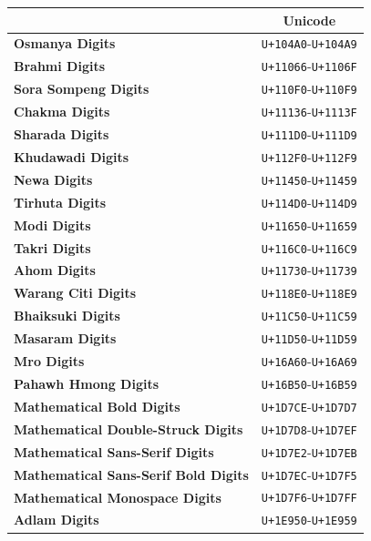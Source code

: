 \documentclass [10pt]{article}
\begin{document}
\begin{center}
  \begin{tabular}{|l|c|}
    \hline
    & \textbf{Unicode} \\ \hline
    \textbf{Osmanya Digits} & \texttt{U+104A0}-\texttt{U+104A9} \\ \hline
    \textbf{Brahmi Digits} & \texttt{U+11066}-\texttt{U+1106F} \\ \hline
    \textbf{Sora Sompeng Digits} & \texttt{U+110F0}-\texttt{U+110F9} \\ \hline
    \textbf{Chakma Digits} & \texttt{U+11136}-\texttt{U+1113F} \\ \hline
    \textbf{Sharada Digits} & \texttt{U+111D0}-\texttt{U+111D9} \\ \hline
    \textbf{Khudawadi Digits} & \texttt{U+112F0}-\texttt{U+112F9} \\ \hline
    \textbf{Newa Digits} & \texttt{U+11450}-\texttt{U+11459} \\ \hline
    \textbf{Tirhuta Digits} & \texttt{U+114D0}-\texttt{U+114D9} \\ \hline
    \textbf{Modi Digits} & \texttt{U+11650}-\texttt{U+11659} \\ \hline
    \textbf{Takri Digits} & \texttt{U+116C0}-\texttt{U+116C9} \\ \hline
    \textbf{Ahom Digits} & \texttt{U+11730}-\texttt{U+11739} \\ \hline
    \textbf{Warang Citi Digits} & \texttt{U+118E0}-\texttt{U+118E9} \\ \hline
    \textbf{Bhaiksuki Digits} & \texttt{U+11C50}-\texttt{U+11C59} \\ \hline
    \textbf{Masaram Digits} & \texttt{U+11D50}-\texttt{U+11D59} \\ \hline
    \textbf{Mro Digits} & \texttt{U+16A60}-\texttt{U+16A69} \\ \hline
    \textbf{Pahawh Hmong Digits} & \texttt{U+16B50}-\texttt{U+16B59} \\ \hline
    \textbf{Mathematical Bold Digits}
    & \texttt{U+1D7CE}-\texttt{U+1D7D7} \\ \hline
    \textbf{Mathematical Double-Struck Digits}
    & \texttt{U+1D7D8}-\texttt{U+1D7EF} \\ \hline
    \textbf{Mathematical Sans-Serif Digits}
    & \texttt{U+1D7E2}-\texttt{U+1D7EB} \\ \hline
    \textbf{Mathematical Sans-Serif Bold Digits}
    & \texttt{U+1D7EC}-\texttt{U+1D7F5} \\ \hline
    \textbf{Mathematical Monospace Digits}
    & \texttt{U+1D7F6}-\texttt{U+1D7FF} \\ \hline
    \textbf{Adlam Digits}
    & \texttt{U+1E950}-\texttt{U+1E959} \\ \hline
  \end{tabular}
\end{center}
\end{document}
